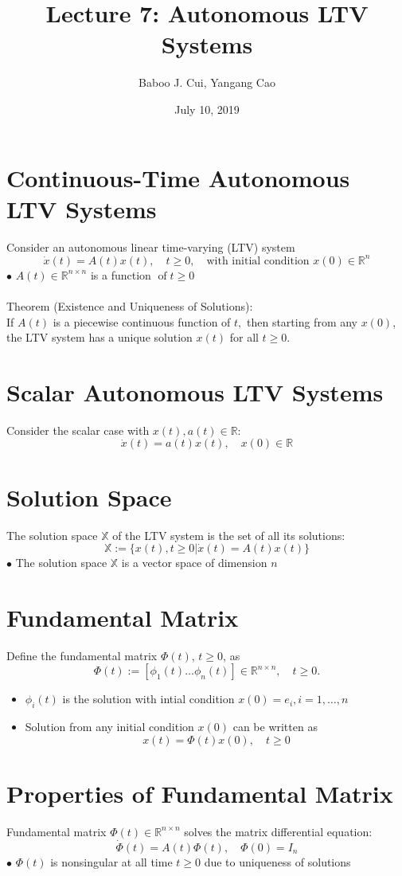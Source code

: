 \documentclass[10pt,a4paper,oneside]{article}
\date{July 10, 2019}
\author{Baboo J. Cui, Yangang Cao}
\title{Lecture 7: Autonomous LTV Systems}
\begin{document}
\maketitle
\tableofcontents
\newpage
\section{Continuous-Time Autonomous LTV Systems}
Consider an autonomous linear time-varying (LTV) system
\[
\dot{x}(t)=A(t)x(t),\quad t\geq0,\quad \text{with initial condition $x(0)\in\mathbb{R}^n$}
\]
$\bullet$ $A(t) \in \mathbb{R}^{n \times n}$ is a function $\operatorname{of} t  \geq 0$\\
\\
Theorem (Existence and Uniqueness of Solutions):\\
If $A(t)$ is a piecewise continuous function of $t,$ then starting from any $x(0)$, the LTV system has a unique solution $x(t)$ for all $t \geq 0$.
\section{Scalar Autonomous LTV Systems}
Consider the scalar case with $x(t), a(t)\in\mathbb{R}$:
\[
\dot{x}(t)=a(t) x(t), \quad x(0) \in \mathbb{R}
\]
\section{Solution Space}
The solution space $\mathbb{X}$ of the LTV system is the set of all its solutions:
\[
\mathbb{X} :=\{x(t), t \geq 0 | \dot{x}(t)=A(t) x(t)\}
\]
$\bullet$ The solution space $\mathbb{X}$ is a vector space of dimension $n$
\section{Fundamental Matrix}
Define the fundamental matrix $\Phi(t)$, $t\geq0$, as
\[
\Phi(t) :=\left[\phi_{1}(t) \ldots \phi_{n}(t)\right] \in \mathbb{R}^{n \times n}, \quad t \geq 0.
\]
\begin{itemize}
\item $\phi_{i}(t)$ is the solution with intial condition $x(0)=e_{i}, i=1, \ldots, n$
\item Solution from any initial condition $x(0)$ can be written as
\[
x(t)=\Phi(t) x(0), \quad t \geq 0
\]
\end{itemize}
\section{Properties of Fundamental Matrix}
Fundamental matrix $\Phi(t) \in \mathbb{R}^{n \times n}$ solves the matrix differential equation:
\[
\dot{\Phi}(t)=A(t) \Phi(t), \quad \Phi(0)=I_{n}
\]
$\bullet$ $\Phi(t)$ is nonsingular at all time $t\geq0$ due to uniqueness of solutions
\end{document}
